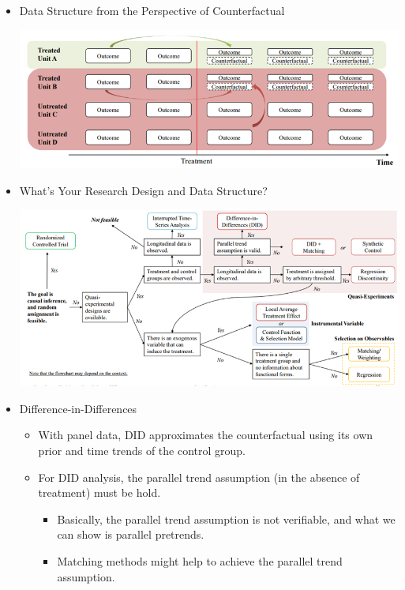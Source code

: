 \documentclass[
]{book}
\providecommand{\tightlist}{%
  \setlength{\itemsep}{0pt}\setlength{\parskip}{0pt}}
\theoremstyle{definition}
\theoremstyle{definition}
\theoremstyle{definition}
\theoremstyle{definition}
\theoremstyle{remark}
\begin{document}
\begin{itemize}
\item
  Data Structure from the Perspective of Counterfactual

  \includegraphics{figures/24.png}
\item
  What's Your Research Design and Data Structure?

  \includegraphics{figures/25.png}
\item
  Difference-in-Differences

  \begin{itemize}
  \tightlist
  \item
    With panel data, DID approximates the counterfactual using its own prior and time trends of the control group.
  \item
    For DID analysis, the parallel trend assumption (in the absence of treatment) must be hold.

    \begin{itemize}
    \tightlist
    \item
      Basically, the parallel trend assumption is not verifiable, and what we can show is parallel pretrends.
    \item
      Matching methods might help to achieve the parallel trend assumption.
    \end{itemize}
  \end{itemize}
\end{itemize}
\end{document}
